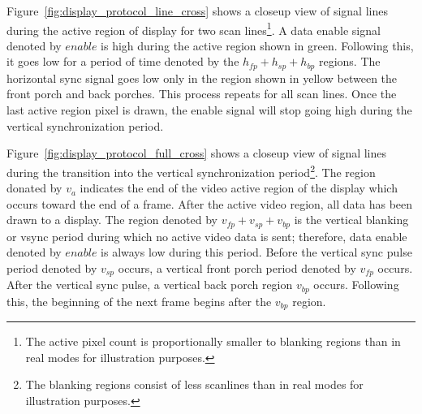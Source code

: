     Figure~\ref{fig:display_protocol_line_cross} shows a closeup view of signal lines during the active region of display for two scan lines\footnote{The active pixel count is proportionally smaller to blanking regions than in real modes for illustration purposes.}. A data enable signal denoted by $enable$ is high during the active region shown in green. Following this, it goes low for a period of time denoted by the $h_{fp}+h_{sp}+h_{bp}$ regions. The horizontal sync signal goes low only in the region shown in yellow between the front porch and back porches. This process repeats for all scan lines. Once the last active region pixel is drawn, the enable signal will stop going high during the vertical synchronization period.


    Figure~\ref{fig:display_protocol_full_cross} shows a closeup view of signal lines during the transition into the vertical synchronization period\footnote{The blanking regions consist of less scanlines than in real modes for illustration purposes.}. The region donated by $v_a$ indicates the end of the video active region of the display which occurs toward the end of a frame. After the active video region, all data has been drawn to a display. The region denoted by $v_{fp}+v_{sp}+v_{bp}$ is the vertical blanking or vsync period during which no active video data is sent; therefore, data enable denoted by $enable$ is always low during this period. Before the vertical sync pulse period denoted by $v_{sp}$ occurs, a vertical front porch period denoted by $v_{fp}$ occurs. After the vertical sync pulse, a vertical back porch region $v_{bp}$ occurs. Following this, the beginning of the next frame begins after the $v_{bp}$ region.

